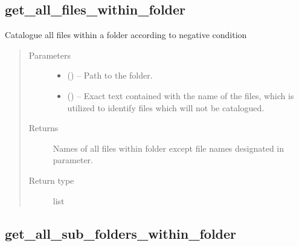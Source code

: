 \documentclass[a4paper,10pt,english]{sphinxmanual}
\begin{document}
\subsection{get\_all\_files\_within\_folder}
\label{\detokenize{api/ucf.get_all_files_within_folder:get-all-files-within-folder}}\label{\detokenize{api/ucf.get_all_files_within_folder::doc}}

\begin{fulllineitems}
\label{\detokenize{api/ucf.get_all_files_within_folder:ucf.get_all_files_within_folder}}
Catalogue all files within a folder according to negative condition
\begin{quote}\begin{description}
\item[{Parameters}] \leavevmode\begin{itemize}
\item {} 
 () -- Path to the folder.

\item {} 
 () -- Exact text contained with the name of the files, which is
utilized to identify files which will not be catalogued.

\end{itemize}

\item[{Returns}] \leavevmode
Names of all files within folder except file names designated in
 parameter.

\item[{Return type}] \leavevmode
list

\end{description}\end{quote}

\end{fulllineitems}



\subsection{get\_all\_sub\_folders\_within\_folder}
\label{\detokenize{api/ucf.get_all_sub_folders_within_folder:get-all-sub-folders-within-folder}}\label{\detokenize{api/ucf.get_all_sub_folders_within_folder::doc}}
\end{document}
